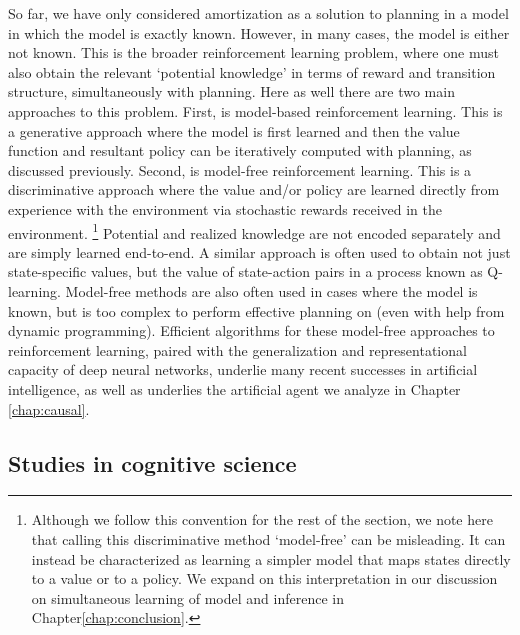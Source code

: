 So far, we have only considered amortization as a solution to planning in a model in which the model is exactly known. However, in many cases, the model is either not known.
This is the broader reinforcement learning problem, where one must also obtain the relevant `potential knowledge' in terms of reward and transition structure, simultaneously with planning. Here as well there are two main approaches to this problem. First, is model-based reinforcement learning. This is a generative approach where the model is first learned and then the value function and resultant policy can be iteratively computed with planning, as discussed previously. Second, is model-free reinforcement learning. This is a discriminative approach where the value and/or policy are learned directly from experience with the environment via stochastic rewards received in the environment. \footnote{Although we follow this convention for the rest of the section, we note here that calling this discriminative method `model-free' can be misleading. It can instead be characterized as learning a simpler model that maps states directly to a value or to a policy. We expand on this interpretation in our discussion on simultaneous learning of model and inference in Chapter\ref{chap:conclusion}.} Potential and realized knowledge are not encoded separately and are simply learned end-to-end. A similar approach is often used to obtain not just state-specific values, but the value of state-action pairs in a process known as Q-learning\citep{watkins1992q}. Model-free methods are also often used in cases where the model is known, but is too complex to perform effective planning on (even with help from dynamic programming). Efficient algorithms for these model-free approaches to reinforcement learning, paired with the generalization and representational capacity of deep neural networks, underlie many recent successes in artificial intelligence\citep{mnih2013playing}, as well as underlies the artificial agent we analyze in Chapter \ref{chap:causal}. %

\subsection*{Studies in cognitive science}

